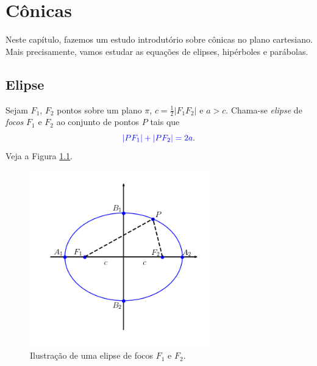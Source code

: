 
\chapter{Cônicas}\label{cap_conicas}
\thispagestyle{fancy}

Neste capítulo, fazemos um estudo introdutório sobre cônicas no plano cartesiano. Mais precisamente, vamos estudar as equações de elipses, hipérboles e parábolas.

\section{Elipse}\label{cap_conicas_sec_elipse}

Sejam $F_1$, $F_2$ pontos sobre um plano $\pi$, $c = \frac{1}{2}|F_1F_2|$ e $a > c$. Chama-se \emph{elipse} de \emph{focos} $F_1$ e $F_2$ ao conjunto de pontos $P$ tais que
\begin{equation}
  {\color{blue}|PF_1| + |PF_2| = 2a}.
\end{equation}
Veja a Figura \ref{fig:elipse}.

\begin{figure}[H]
  \centering
  \includegraphics[width=0.7\textwidth]{./cap_conicas/dados/fig_elipse/fig_elipse}
  \caption{Ilustração de uma elipse de focos $F_1$ e $F_2$.}
  \label{fig:elipse}
\end{figure}

